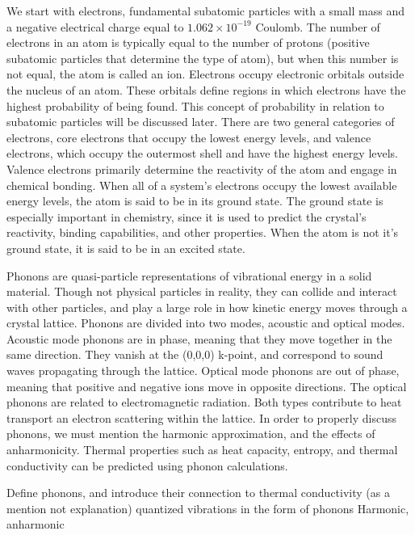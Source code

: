 We start with electrons, fundamental subatomic particles with a small mass and a negative electrical charge equal to $1.062 \times 10^{-19}$ Coulomb. The number of electrons in an atom is typically equal to the number of protons (positive subatomic particles that determine the type of atom), but when this number is not equal, the atom is called an ion. Electrons occupy electronic orbitals outside the nucleus of an atom. These orbitals define regions in which electrons have the highest probability of being found. This concept of probability in relation to subatomic particles will be discussed later. There are two general categories of electrons, core electrons that occupy the lowest energy levels, and valence electrons, which occupy the outermost shell and have the highest energy levels. Valence electrons primarily determine the reactivity of the atom and engage in chemical bonding. When all of a system's electrons occupy the lowest available energy levels, the atom is said to be in its ground state. The ground state is especially important in chemistry, since it is used to predict the crystal's reactivity, binding capabilities, and other properties. When the atom is not it's ground state, it is said to be in an excited state.

Phonons are quasi-particle representations of vibrational energy in a solid material. Though not physical particles in reality, they can collide and interact with other particles, and play a large role in how kinetic energy moves through a crystal lattice. Phonons are divided into two modes, acoustic and optical modes. Acoustic mode phonons are in phase, meaning that they move together in the same direction. They vanish at the (0,0,0) k-point, and correspond to sound waves propagating through the lattice. Optical mode phonons are out of phase, meaning that positive and negative ions move in opposite directions. The optical phonons are related to electromagnetic radiation. Both types contribute to heat transport an electron scattering within the lattice.
In order to properly discuss phonons, we must mention the harmonic approximation, and the effects of anharmonicity.
Thermal properties such as heat capacity, entropy, and thermal conductivity can be predicted using phonon calculations.

Define phonons, and introduce their connection to thermal conductivity (as a mention not explanation)
quantized vibrations in the form of phonons
Harmonic, anharmonic

\autocite{togoFirstprinciplesPhononCalculations2023}
\autocite{togoImplementationStrategiesPhonon2023}

